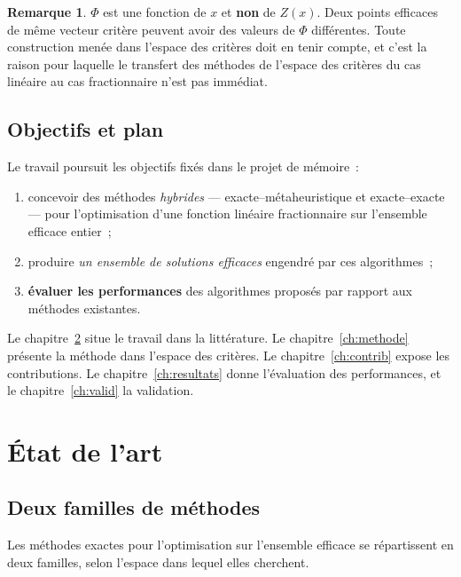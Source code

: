 \documentclass[12pt,a4paper]{report}
\newcommand{\Z}{Z}
\theoremstyle{plain}
\theoremstyle{definition}
\newtheorem{remarque}[theoreme]{Remarque}
\begin{document}
\begin{remarque}\label{rem:notZ}
$\Phi$ est une fonction de $x$ et \textbf{non} de $\Z(x)$.  Deux points
efficaces de même vecteur critère peuvent avoir des valeurs de $\Phi$
différentes.  Toute construction menée dans l'espace des critères doit en tenir
compte, et c'est la raison pour laquelle le transfert des méthodes de l'espace
des critères du cas linéaire au cas fractionnaire n'est pas immédiat.
\end{remarque}

\section{Objectifs et plan}

Le travail poursuit les objectifs fixés dans le projet de mémoire~:

\begin{enumerate}[itemsep=3pt]
\item concevoir des méthodes \emph{hybrides} --- exacte--métaheuristique et
      exacte--exacte --- pour l'optimisation d'une fonction linéaire
      fractionnaire sur l'ensemble efficace entier~;
\item produire \emph{un ensemble de solutions efficaces} engendré par ces
      algorithmes~;
\item \textbf{évaluer les performances} des algorithmes proposés par rapport
      aux méthodes existantes.
\end{enumerate}

\noindent
Le chapitre~\ref{ch:etat} situe le travail dans la littérature.  Le
chapitre~\ref{ch:methode} présente la méthode dans l'espace des critères.  Le
chapitre~\ref{ch:contrib} expose les contributions.  Le
chapitre~\ref{ch:resultats} donne l'évaluation des performances, et le
chapitre~\ref{ch:valid} la validation.


\chapter{État de l'art}
\label{ch:etat}

\section{Deux familles de méthodes}

Les méthodes exactes pour l'optimisation sur l'ensemble efficace se répartissent
en deux familles, selon l'espace dans lequel elles cherchent.
\end{document}
